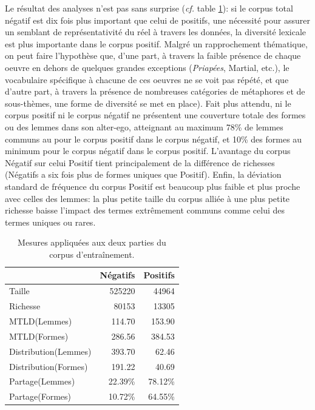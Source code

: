 Le résultat des analyses n'est pas sans surprise (\textit{cf.} table \ref{tab:chap4:mesures-corpora}): si le corpus total négatif est dix fois plus important que celui de positifs, une nécessité pour assurer un semblant de représentativité du réel à travers les données, la diversité lexicale est plus importante dans le corpus positif. Malgré un rapprochement thématique, on peut faire l'hypothèse que, d'une part, à travers la faible présence de chaque oeuvre en dehors de quelques grandes exceptions (\textit{Priapées}, Martial, etc.), le vocabulaire spécifique à chacune de ces oeuvres ne se voit pas répété, et que d'autre part, à travers la présence de nombreuses catégories de métaphores et de sous-thèmes, une forme de diversité se met en place). Fait plus attendu, ni le corpus positif ni le corpus négatif ne présentent une couverture totale des formes ou des lemmes dans son alter-ego, atteignant au maximum 78\% de lemmes communs au pour le corpus positif dans le corpus négatif, et 10\% des formes au minimum pour le corpus négatif dans le corpus positif. L'avantage du corpus Négatif sur celui Positif tient principalement de la différence de richesses (Négatifs a six fois plus de formes uniques que Positif). Enfin, la déviation standard de fréquence du corpus Positif est beaucoup plus faible et plus proche avec celles des lemmes: la plus petite taille du corpus alliée à une plus petite richesse baisse l'impact des termes extrêmement communs comme celui des termes uniques ou rares.

\begin{table}[ht]
    \centering
    \begin{tabular}{l|rr}
    \toprule
    {} &  Négatifs &  Positifs \\
    \midrule
    Taille               & 525220    &  44964    \\
    Richesse             &  80153    &  13305    \\
    MTLD(Lemmes)         &    114.70 &    153.90 \\
    MTLD(Formes)         &    286.56 &    384.53 \\
    Distribution(Lemmes) &    393.70 &     62.46 \\
    Distribution(Formes) &    191.22 &     40.69 \\
    Partage(Lemmes)      &   22.39\% &   78.12\% \\
    Partage(Formes)      &   10.72\% &   64.55\% \\
    \bottomrule
    \end{tabular}
    \caption{Mesures appliquées aux deux parties du corpus d'entraînement.}
    \label{tab:chap4:mesures-corpora}
\end{table}

